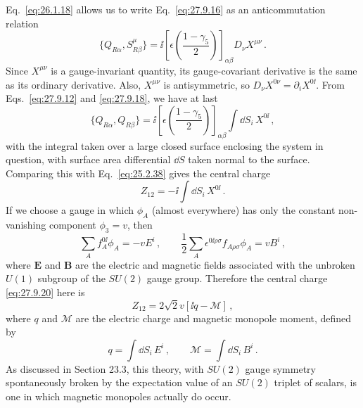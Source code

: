 Eq.~\eqref{eq:26.1.18} allows us to write Eq.~\eqref{eq:27.9.16} as an
anticommutation relation
\begin{equation}
  \{Q_{R\alpha},S_{R\beta}^\mu\}
  =\ii\left[\epsilon\left(\frac{1-\gamma_5}{2}\right)\right]_{\alpha\beta}
    D_\nu X^{\mu\nu}\,.
  \tag{27.9.18}\label{eq:27.9.18}
\end{equation}
Since \(X^{\mu\nu}\) is a gauge-invariant quantity, its gauge-covariant
derivative is the same as its ordinary derivative. Also, \(X^{\mu\nu}\) is
antisymmetric, so \(D_\nu X^{0\nu}=\partial_iX^{0\ii}\). From
Eqs.~\eqref{eq:27.9.12} and \eqref{eq:27.9.18}, we have at last
\begin{equation}
  \{Q_{R\alpha},Q_{R\beta}\}
  =\ii\left[\epsilon\left(\frac{1-\gamma_5}{2}\right)\right]_{\alpha\beta}
    \int \dd S_i\,X^{0\ii}\,,
  \tag{27.9.19}\label{eq:27.9.19}
\end{equation}
with the integral taken over a large closed surface enclosing the system in
question, with surface area differential \(\dd S\) taken normal to the surface.
Comparing this with Eq.~\eqref{eq:25.2.38} gives the central charge
\begin{equation}
  Z_{12}=-\ii\int \dd S_i\,X^{0\ii}\,.
  \tag{27.9.20}\label{eq:27.9.20}
\end{equation}
If we choose a gauge in which \(\phi_A\) (almost everywhere) has only the
constant non-vanishing component \(\phi_3=v\), then
\begin{equation}
  \sum_Af_A^{0\ii}\phi_A=-vE^i\,,
  \qquad
  \frac12\sum_A\epsilon^{0\ii\rho\sigma}f_{A\rho\sigma}\phi_A=vB^i\,,
  \tag{27.9.21}\label{eq:27.9.21}
\end{equation}
where \(\mathbf{E}\) and \(\mathbf{B}\) are the electric and magnetic fields
associated with the unbroken \(U(1)\) subgroup of the \(SU(2)\) gauge group.
Therefore the central charge \eqref{eq:27.9.20} here is
\begin{equation}
  Z_{12}=2\sqrt{2}v[\ii q-\mathcal{M}]\,,
  \tag{27.9.22}\label{eq:27.9.22}
\end{equation}
where \(q\) and \(\mathcal{M}\) are the electric charge and magnetic monopole
moment, defined by
\begin{equation}
  q=\int \dd S_i\,E^i\,,
  \qquad
  \mathcal{M}=\int \dd S_i\,B^i\,.
  \tag{27.9.23}\label{eq:27.9.23}
\end{equation}
As discussed in Section 23.3, this theory, with \(SU(2)\) gauge symmetry
spontaneously broken by the expectation value of an \(SU(2)\) triplet of
scalars, is one in which magnetic monopoles actually do occur.

